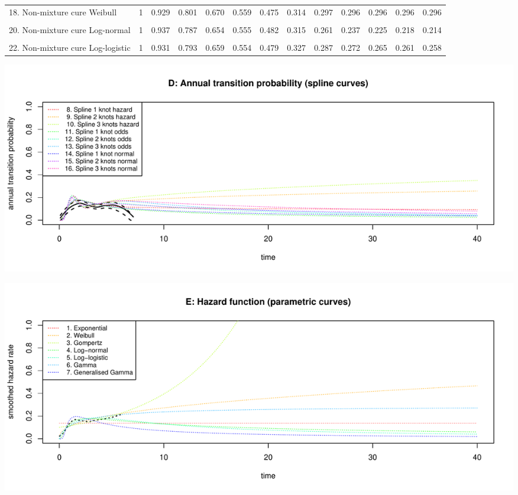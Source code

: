 \documentclass[
]{article}
\begin{document}
\begin{table}
{\begin{tabular}[t]{lrrrrrrrrrrrr}
18. Non-mixture cure Weibull & 1 & 0.929 & 0.801 & 0.670 & 0.559 & 0.475 & 0.314 & 0.297 & 0.296 & 0.296 & 0.296 & 0.296\\
\cellcolor{gray!6}{19. Mixture cure Log-normal} & \cellcolor{gray!6}{1} & \cellcolor{gray!6}{0.936} & \cellcolor{gray!6}{0.790} & \cellcolor{gray!6}{0.658} & \cellcolor{gray!6}{0.556} & \cellcolor{gray!6}{0.479} & \cellcolor{gray!6}{0.295} & \cellcolor{gray!6}{0.238} & \cellcolor{gray!6}{0.215} & \cellcolor{gray!6}{0.205} & \cellcolor{gray!6}{0.200} & \cellcolor{gray!6}{0.197}\\
20. Non-mixture cure Log-normal & 1 & 0.937 & 0.787 & 0.654 & 0.555 & 0.482 & 0.315 & 0.261 & 0.237 & 0.225 & 0.218 & 0.214\\
\cellcolor{gray!6}{21. Mixture cure Log-logistic} & \cellcolor{gray!6}{1} & \cellcolor{gray!6}{0.931} & \cellcolor{gray!6}{0.793} & \cellcolor{gray!6}{0.658} & \cellcolor{gray!6}{0.553} & \cellcolor{gray!6}{0.477} & \cellcolor{gray!6}{0.318} & \cellcolor{gray!6}{0.275} & \cellcolor{gray!6}{0.259} & \cellcolor{gray!6}{0.250} & \cellcolor{gray!6}{0.246} & \cellcolor{gray!6}{0.243}\\
22. Non-mixture cure Log-logistic & 1 & 0.931 & 0.793 & 0.659 & 0.554 & 0.479 & 0.327 & 0.287 & 0.272 & 0.265 & 0.261 & 0.258\\
\bottomrule
\end{tabular}}
\end{table}

\begin{flushleft}\includegraphics[height=0.29\textheight]{Images/validate_extrapolation2-4} \end{flushleft}

\begin{flushleft}\includegraphics[height=0.29\textheight]{Images/validate_extrapolation2-5} \end{flushleft}
\end{document}
